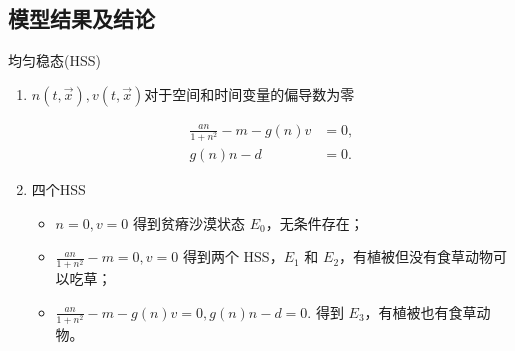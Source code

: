 \documentclass[aspectratio=169, 12pt, utf8, mathserif]{ctexbeamer} %
\begin{document}
\subsection{模型结果及结论}


\begin{frame}
	\begin{exampleblock}{均匀稳态(HSS)}
		\begin{enumerate}
			\item \(n(t,\vec{x}),v(t,\vec{x})\)对于空间和时间变量的偏导数为零
		\begin{center}
			\begin{align*}
				\frac{an}{1+n^2}-m-g(n)v &= 0, \\
				g(n)n-d &= 0.
			\end{align*}
		\end{center}
			\item 四个HSS
			
			\begin{itemize}
				\item \(n=0, v=0\) 得到贫瘠沙漠状态 \(E_{0}\)，无条件存在；
				\item \(\frac{an}{1+n^2}-m=0, v=0\) 得到两个 HSS，\(E_{1}\) 和 \(E_{2}\)，有植被但没有食草动物可以吃草；
				\item \(\frac{an}{1+n^2}-m-g(n)v=0, g(n)n-d=0.\) 得到 \(E_{3}\)，有植被也有食草动物。
			\end{itemize}
		\end{enumerate}
	\end{exampleblock}
\end{frame}
\end{document}
